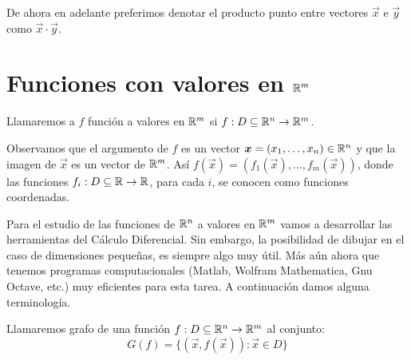 \begin{nota}
De ahora en adelante preferimos denotar el producto punto entre vectores $\vec{x}$ e $\vec{y}$ como $\vec{x}\cdot \vec{y}$.
\end{nota}

\section{Funciones con valores en \texorpdfstring{$\mathbb{R}^m$}{Rm}}

\begin{definicion} Llamaremos a $f$ funci\'on a valores en $\mathbb{R}^m$ si
$f:D \subseteq \mathbb{R}^n \to \mathbb{R}^m$.
\end{definicion}
Observamos que el argumento de $f$ es un vector $\boldsymbol{x}=(x_1,\ldots,x_n)\in \mathbb{R}^n$
y que la imagen de $\vec{x}$ es un vector de $\mathbb{R}^m$. As\'i $f(\vec{x})=(f_1(\vec{x}),\ldots,f_m(\vec{x}))$, donde las funciones $f_i:D \subseteq \mathbb{R}\to\mathbb{R}$, para cada $i$, se conocen como funciones coordenadas.

Para el estudio de las funciones de $\mathbb{R}^n$ a valores en $\mathbb{R}^m$ vamos a 
desarrollar las herramientas del C\'alculo Diferencial. Sin embargo, 
la posibilidad de dibujar en el caso de dimensiones peque\~nas, 
es siempre algo muy \'util. M\'as a\'un
ahora que tenemos programas computacionales (Matlab, Wolfram Mathematica, Gnu Octave, etc.) muy eficientes para esta tarea.
A continuaci\'on damos alguna terminolog\'ia.

\begin{definicion}\label{defgrafo}
Llamaremos grafo de una funci\'on $f:D \subseteq \mathbb{R}^n \to \mathbb{R}^m$
al conjunto: $$G(f)=\{(\vec{x},f(\vec{x})): \vec{x}\in D\}$$
\end{definicion}

